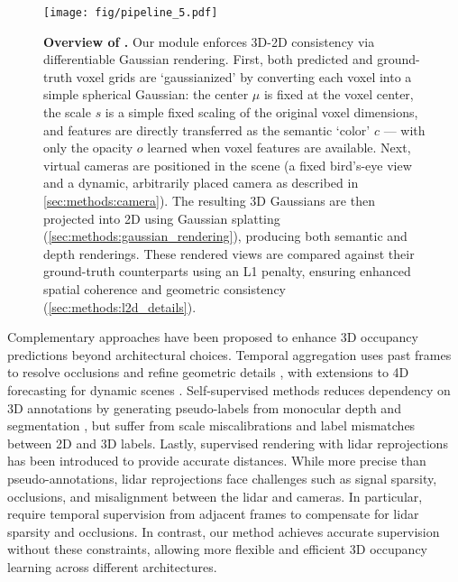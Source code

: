 \begin{figure*}[t]
\centering
    \texttt{[image: fig/pipeline\_5.pdf]}
    \caption{\textbf{Overview of \method{}.}
    Our module enforces 3D-2D consistency via differentiable Gaussian rendering. First, both predicted and ground-truth voxel grids are `gaussianized' by converting each voxel into a simple spherical Gaussian: the center $\mu$ is fixed at the voxel center, {the scale $s$ is a simple fixed scaling of the original voxel dimensions}, and features are directly transferred {as the semantic `color' $c$} --- with only the opacity $o$ learned when voxel features are available. Next, virtual cameras are positioned in the scene (a fixed bird’s-eye view and a dynamic, arbitrarily placed camera as described in \autoref{sec:methods:camera}). The resulting 3D Gaussians are then projected into 2D using Gaussian splatting (\autoref{sec:methods:gaussian_rendering}), producing both semantic and depth renderings. These rendered views are compared against their ground-truth counterparts using an L1 penalty, ensuring enhanced spatial coherence and geometric consistency (\autoref{sec:methods:l2d_details}).
    }
    \label{fig:pipeline}
\end{figure*}


Complementary approaches have been proposed to enhance 3D occupancy predictions beyond architectural choices.
Temporal aggregation uses past frames to resolve occlusions and refine geometric details \cite{li2024viewformer, ye2024cvtoccc, li2024hierarchical, silva2024uniftri, pan2024renderocc}, with extensions to 4D forecasting for dynamic scenes \cite{khurana2023point, yang2025drivingoccupancy, wang2024occsora, ma2024cotr}.
Self-supervised methods reduces dependency on 3D annotations by generating pseudo-labels from monocular depth and segmentation \cite{huang2024selfocc, gan2024gaussianocc}, but suffer from scale miscalibrations and label mismatches between 2D and 3D labels.
Lastly, supervised rendering with lidar reprojections \cite{pan2024renderocc,sun2024gsrender} has been introduced to provide accurate distances. While more precise than pseudo-annotations, lidar reprojections face challenges such as signal sparsity, occlusions, and misalignment between the lidar and cameras.
{In particular, \cite{pan2024renderocc,sun2024gsrender} require temporal supervision from adjacent frames to compensate for lidar sparsity and occlusions. In contrast, our method achieves accurate supervision without these constraints, allowing more flexible and efficient 3D occupancy learning across different architectures.
}


